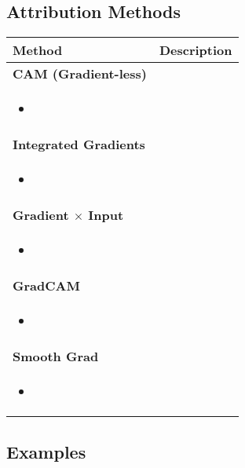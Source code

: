 \subsection{Attribution Methods}
\begin{summary}
    \begin{center}
        \begin{tabular}{ll}
            \toprule
            \textbf{Method} & \textbf{Description} \\
            \midrule
            \textbf{CAM (Gradient-less)} & \\
            \multicolumn{2}{p{\linewidth}}{
            \begin{itemize}
                \item 
            \end{itemize}} \\
            \midrule
            \textbf{Integrated Gradients} & \\
            \multicolumn{2}{p{\linewidth}}{
            \begin{itemize}
                \item 
            \end{itemize}} \\
            \midrule
            \textbf{Gradient $\times$ Input} & \\
            \multicolumn{2}{p{\linewidth}}{
            \begin{itemize}
                \item 
            \end{itemize}} \\
            \midrule
            \textbf{GradCAM} & \\
            \multicolumn{2}{p{\linewidth}}{
            \begin{itemize}
                \item 
            \end{itemize}} \\
            \midrule
            \textbf{Smooth Grad} & \\
            \multicolumn{2}{p{\linewidth}}{
            \begin{itemize}
                \item 
            \end{itemize}} \\
            \bottomrule
        \end{tabular}
    \end{center}
\end{summary}

\subsection{Examples}
